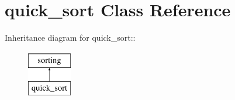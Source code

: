 \hypertarget{classquick__sort}{
\section{quick\_\-sort Class Reference}
\label{db/df3/classquick__sort}
}
Inheritance diagram for quick\_\-sort::\begin{figure}[H]
\begin{center}
\leavevmode
\includegraphics[height=2cm]{db/df3/classquick__sort}
\end{center}
\end{figure}
